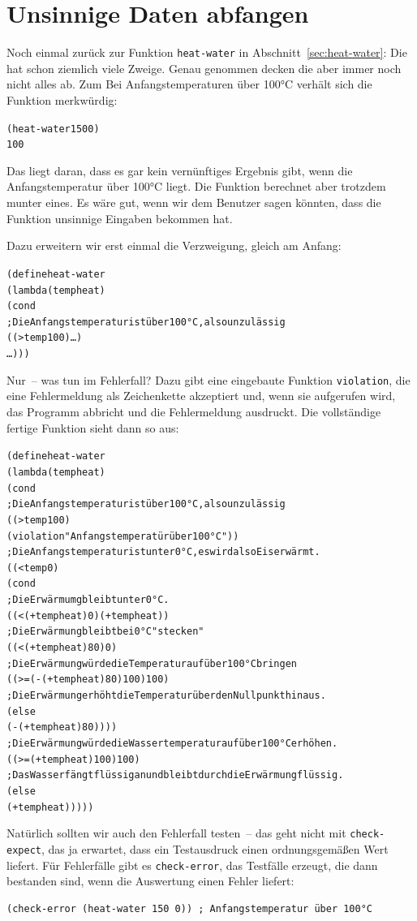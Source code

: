 \section{Unsinnige Daten abfangen}
\label{sec:nonsensical-data}

Noch einmal zurück zur Funktion \texttt{heat-water} in
Abschnitt~\ref{sec:heat-water}: Die hat schon ziemlich viele Zweige.
Genau genommen decken die aber immer noch nicht alles ab.  Zum
Bei Anfangstemperaturen über 100°C verhält sich die Funktion merkwürdig:
%
\begin{alltt}
(heat-water 150 0)
\evalsto{} 100
\end{alltt}
%
Das liegt daran, dass es gar kein vernünftiges Ergebnis gibt, wenn die
Anfangstemperatur über 100°C liegt.  Die Funktion berechnet aber
trotzdem munter eines.  Es wäre gut, wenn wir dem Benutzer sagen
könnten, dass die Funktion unsinnige Eingaben bekommen hat.

Dazu erweitern wir erst einmal die Verzweigung, gleich am Anfang:
%
\begin{alltt}
(define heat-water
  (lambda (temp heat)
    (cond
      ; Die Anfangstemperatur ist über 100°C, also unzulässig
      ((> temp 100) \ldots)
      \ldots)))
\end{alltt}
%
Nur~-- was tun im Fehlerfall?  Dazu gibt eine eingebaute Funktion
\texttt{violation}, die eine Fehlermeldung als Zeichenkette akzeptiert
und, wenn sie aufgerufen wird, das Programm abbricht und die
Fehlermeldung ausdruckt.  Die vollständige fertige Funktion sieht
dann so aus:
%
\begin{alltt}
(define heat-water
  (lambda (temp heat)
    (cond
      ; Die Anfangstemperatur ist über 100°C, also unzulässig
      ((> temp 100)
       (violation "Anfangstemperatür über 100°C"))
      ; Die Anfangstemperatur ist unter 0°C, es wird also Eis erwärmt.
      ((< temp 0)
       (cond
         ; Die Erwärmumg bleibt unter 0°C.
         ((< (+ temp heat) 0) (+ temp heat))
         ; Die Erwärmung bleibt bei  0°C "stecken"
         ((< (+ temp heat) 80) 0)
         ; Die Erwärmung würde die Temperatur auf über 100°C bringen
         ((>= (- (+ temp heat) 80) 100) 100)
         ; Die Erwärmung erhöht die Temperatur über den Nullpunkt hinaus.
         (else
          (- (+ temp heat) 80))))
      ; Die Erwärmung würde die Wassertemperatur auf über 100°C erhöhen.
      ((>= (+ temp heat) 100) 100)
      ; Das Wasser fängt flüssig an und bleibt durch die Erwärmung flüssig.
      (else
       (+ temp heat)))))
\end{alltt}
%
Natürlich sollten wir auch den Fehlerfall testen~-- das geht nicht mit
\texttt{check-expect}, das ja erwartet, dass ein Testausdruck einen
ordnungsgemäßen Wert liefert.  Für Fehlerfälle gibt es
\texttt{check-error}, das Testfälle erzeugt, die dann bestanden sind,
wenn die Auswertung einen Fehler liefert:
%
\begin{verbatim}
(check-error (heat-water 150 0)) ; Anfangstemperatur über 100°C
\end{verbatim}

